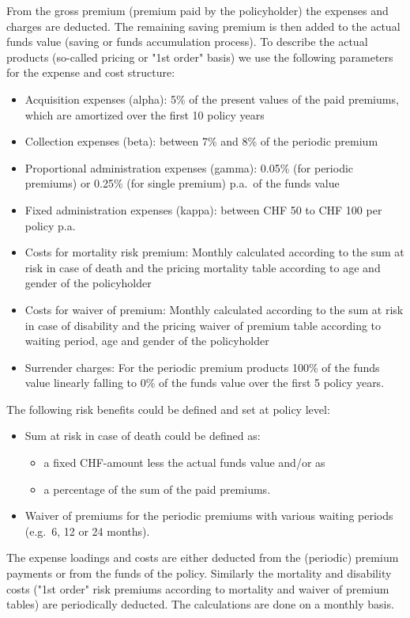 From the gross premium (premium paid by the policyholder) the expenses and charges are deducted. The remaining saving premium is then added to the actual funds value (saving or funds accumulation process). To describe the actual products (so-called pricing or "1st order" basis) we use the following parameters for the expense and cost structure:
\begin{itemize}
	\item Acquisition expenses (alpha): 5\% of the present values of the paid premiums, which are amortized over the first 10 policy years
	\item Collection expenses (beta): between 7\% and 8\% of the periodic premium
	\item Proportional administration expenses (gamma): 0.05\% (for periodic premiums) or 0.25\% (for single premium) p.a.~of the funds value
	\item Fixed administration expenses (kappa): between CHF 50 to CHF 100 per policy p.a.~
	\item Costs for mortality risk premium: Monthly calculated according to the sum at risk in case of death and the pricing mortality table according to age and gender of the policyholder
	\item Costs for waiver of premium: Monthly calculated according to the sum at risk in case of disability and the pricing waiver of premium table according to waiting period, age and gender of the policyholder
	\item Surrender charges: For the periodic premium products 100\% of the funds value linearly falling to 0\% of the funds value over the first 5 policy years.
\end{itemize}

The following risk benefits could be defined and set at policy level:
\begin{itemize}
	\item Sum at risk in case of death could be defined as:
		\begin{itemize}
			\item	a fixed CHF-amount less the actual funds value and/or as
			\item a percentage of the sum of the paid premiums.
		\end{itemize}
	\item Waiver of premiums for the periodic premiums with various waiting periods (e.g.~6, 12 or 24 months).
\end{itemize}

The expense loadings and costs are either deducted from the (periodic) premium payments or from the funds of the policy. Similarly the mortality and disability costs ("1st order" risk premiums according to mortality and waiver of premium tables) are periodically deducted. The calculations are done on a monthly basis.

